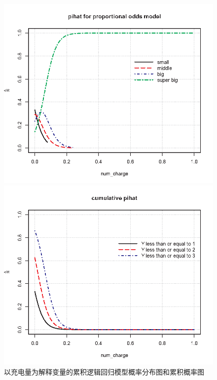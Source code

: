 \documentclass{ctexart}
\begin{document}
\begin{figure}[H]
    \centering
    \begin{minipage}[t]{0.48\textwidth}
        \centering
        \includegraphics[width=\textwidth]{MLR/Figure_propotional.png}
    \end{minipage}
    \begin{minipage}[t]{0.48\textwidth}
        \centering
        \includegraphics[width=\textwidth]{MLR/Figure_cumulative.png}
        
    \end{minipage}
    \caption{以充电量为解释变量的累积逻辑回归模型概率分布图和累积概率图}
\end{figure}
\end{document}
